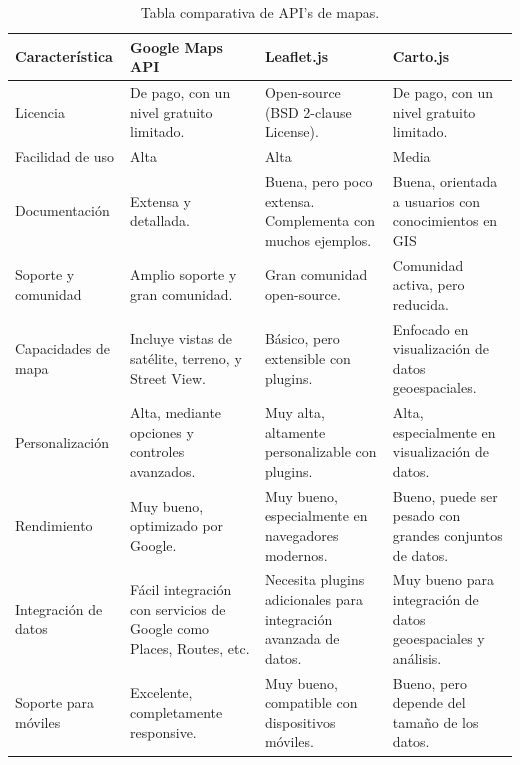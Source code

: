 \begin{table}[h]
    \centering
    \caption{Tabla comparativa de API's de mapas.}
    \begin{tabular}{p{3cm} p{3cm} p{2.5cm} p{2.5cm} }
    \toprule
        \textbf{Característica}           & \textbf{Google Maps API}           & \textbf{Leaflet.js}               & \textbf{Carto.js} \\
        \midrule
        Licencia                & De pago, con un nivel gratuito limitado. & Open-source (BSD 2-clause License). & De pago, con un nivel gratuito limitado. \\
        
        Facilidad de uso        & Alta                               & Alta                              & Media \\
        
        Documentación           & Extensa y detallada.                & Buena, pero poco extensa. Complementa con muchos ejemplos. & Buena, orientada a usuarios con conocimientos en GIS \\
        
        Soporte y comunidad     & Amplio soporte y gran comunidad.    & Gran comunidad open-source.         & Comunidad activa, pero reducida. \\
        
        Capacidades de mapa     & Incluye vistas de satélite, terreno, y Street View. & Básico, pero extensible con plugins. & Enfocado en visualización de datos geoespaciales. \\
        
        Personalización           & Alta, mediante opciones y controles avanzados. & Muy alta, altamente personalizable con plugins. & Alta, especialmente en visualización de datos. \\
        
        Rendimiento             & Muy bueno, optimizado por Google.   & Muy bueno, especialmente en navegadores modernos. & Bueno, puede ser pesado con grandes conjuntos de datos. \\
        
        Integración de datos    & Fácil integración con servicios de Google como Places, Routes, etc. & Necesita plugins adicionales para integración avanzada de datos. & Muy bueno para integración de datos geoespaciales y análisis. \\
        
        Soporte para móviles    & Excelente, completamente responsive. & Muy bueno, compatible con dispositivos móviles. & Bueno, pero depende del tamaño de los datos. \\
        

\end{tabular}
\end{table}

